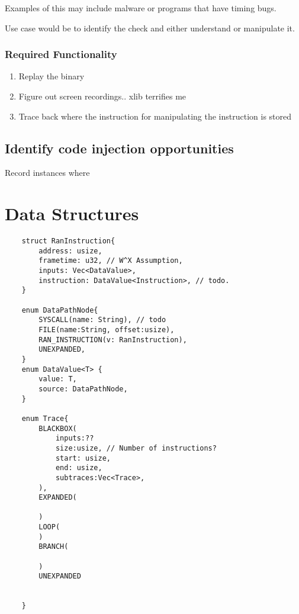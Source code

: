 Examples of this may include malware or programs that have timing bugs. 

Use case would be to identify the check and either understand or manipulate it. 


\subsubsection{Required Functionality}
\begin{enumerate}
    \item Replay the binary 
    \item Figure out screen recordings.. xlib terrifies me
    \item Trace back where the instruction for manipulating the instruction is stored

\end{enumerate}


\subsection{Identify code injection opportunities}
Record instances where 


\section{Data Structures}
\begin{verbatim}
    struct RanInstruction{
        address: usize,
        frametime: u32, // W^X Assumption,
        inputs: Vec<DataValue>,
        instruction: DataValue<Instruction>, // todo. 
    }

    enum DataPathNode{
        SYSCALL(name: String), // todo
        FILE(name:String, offset:usize),
        RAN_INSTRUCTION(v: RanInstruction),
        UNEXPANDED,
    }
    enum DataValue<T> {
        value: T, 
        source: DataPathNode,
    }

    enum Trace{
        BLACKBOX(
            inputs:??
            size:usize, // Number of instructions?
            start: usize,
            end: usize,
            subtraces:Vec<Trace>,
        ),
        EXPANDED(

        )
        LOOP(
        )
        BRANCH(

        )
        UNEXPANDED


    }

\end{verbatim}




